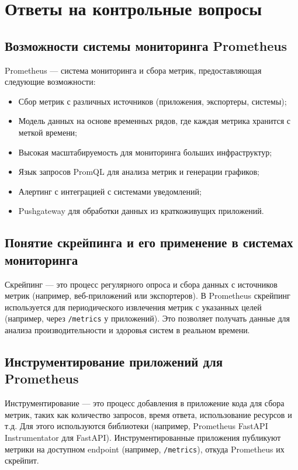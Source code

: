 \clearpage

\section{Ответы на контрольные вопросы}

\subsection{Возможности системы мониторинга Prometheus}

Prometheus --- система мониторинга и сбора метрик,
предоставляющая следующие возможности:

\begin{itemize}
	\item Сбор метрик с различных источников
		(приложения, экспортеры, системы);
	\item Модель данных на основе временных рядов,
		где каждая метрика хранится с меткой времени;
	\item Высокая масштабируемость для мониторинга больших инфраструктур;
	\item Язык запросов PromQL для анализа метрик и генерации графиков;
	\item Алертинг с интеграцией с системами уведомлений;
	\item Pushgateway для обработки данных из краткоживущих приложений.
\end{itemize}

\subsection{Понятие скрейпинга и его применение в системах мониторинга}

Скрейпинг --- это процесс регулярного опроса
и сбора данных с источников метрик (например, веб-приложений или экспортеров).
В Prometheus скрейпинг используется для периодического извлечения метрик
с указанных целей (например, через \texttt{/metrics} у приложений).
Это позволяет получать данные для анализа производительности
и здоровья систем в реальном времени.

\subsection{Инструментирование приложений для Prometheus}

Инструментирование --- это процесс добавления в приложение кода
для сбора метрик, таких как количество запросов, время ответа,
использование ресурсов и т.д. Для этого используются библиотеки
(например, Prometheus FastAPI Instrumentator для FastAPI).
Инструментированные приложения публикуют метрики на доступном endpoint
(например, \texttt{/metrics}), откуда Prometheus их скрейпит.

